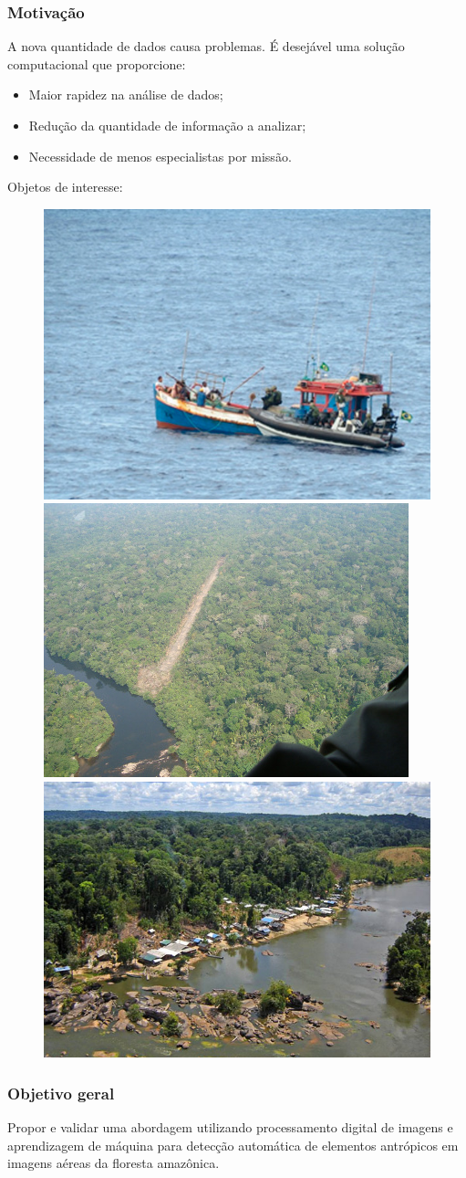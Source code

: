 \documentclass[t]{beamer}
\begin{document}
\begin{frame}[c]
\frametitle{Motivação}

A nova quantidade de dados causa problemas. É desejável uma solução computacional que proporcione:

\begin{itemize}
	\item Maior rapidez na análise de dados;
	\item Redução da quantidade de informação a analizar;
	\item Necessidade de menos especialistas por missão.
\end{itemize}

Objetos de interesse:
	\begin{figure}[h]
		\includegraphics[width=.3\textwidth]{imgs/pesca_ilegal}
		\hspace{0.1cm}
		\includegraphics[width=.3\textwidth]{imgs/pista_de_pouso}
		\hspace{0.1cm}
		\includegraphics[width=.32\textwidth]{imgs/garimpo}
	\end{figure}

\end{frame}

\begin{frame}[c]
\frametitle{Objetivo geral}
	Propor e validar uma abordagem utilizando processamento digital de imagens e aprendizagem de máquina para detecção automática de elementos antrópicos em imagens aéreas da floresta amazônica.
\end{frame}
\end{document}
